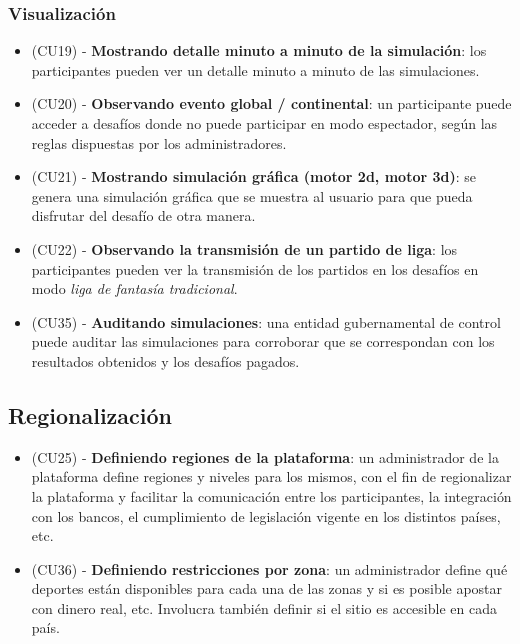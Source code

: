 \subsubsection{Visualización}
\begin{itemize}
\item (CU19) - \textbf{Mostrando detalle minuto a minuto de la simulación}: los participantes pueden ver un detalle minuto a minuto de las simulaciones.
\item (CU20) - \textbf{Observando evento global / continental}: un participante puede acceder a desafíos donde no puede participar en modo espectador, según las reglas dispuestas por los administradores.
\item (CU21) - \textbf{Mostrando simulación gráfica (motor 2d, motor 3d)}: se genera una simulación gráfica que se muestra al usuario para que pueda disfrutar del desafío de otra manera.
\item (CU22) - \textbf{Observando la transmisión de un partido de liga}: los participantes pueden ver la transmisión de los partidos en los desafíos en modo \emph{liga de fantasía tradicional}.
\item (CU35) - \textbf{Auditando simulaciones}: una entidad gubernamental de control puede auditar las simulaciones para corroborar que se correspondan con los resultados obtenidos y los desafíos pagados.
\end{itemize}


\subsection{Regionalización}
\begin{itemize}
\item (CU25) - \textbf{Definiendo regiones de la plataforma}: un administrador de la plataforma define regiones y niveles para los mismos, con el fin de regionalizar la plataforma y facilitar la comunicación entre los participantes, la integración con los bancos, el cumplimiento de legislación vigente en los distintos países, etc.
\item (CU36) - \textbf{Definiendo restricciones por zona}: un administrador define qué deportes están disponibles para cada una de las zonas y si es posible apostar con dinero real, etc. Involucra también definir si el sitio es accesible en cada país.
\end{itemize}






